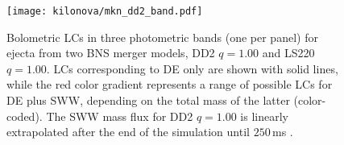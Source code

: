 
\begin{figure}[t]
    \centering
    \texttt{[image: kilonova/mkn\_dd2\_band.pdf]}
    \caption{
        Bolometric \acp{LC} in three photometric bands (one per panel) for 
        ejecta from two \ac{BNS} merger models, 
        DD2 $q=1.00$ and LS220 $q=1.00$. \acp{LC} corresponding to 
        \ac{DE} only are shown with solid lines, while the red color gradient 
        represents a range of possible \acp{LC} for \ac{DE} plus \ac{SWW}, 
        depending on the total mass of the latter (color-coded). 
        The \ac{SWW} mass flux for DD2 $q=1.00$ is linearly extrapolated 
        after the end of the simulation until $250\,$ms \pmerg{}.
%        
    }
    \label{fig:knlc}
\end{figure}






